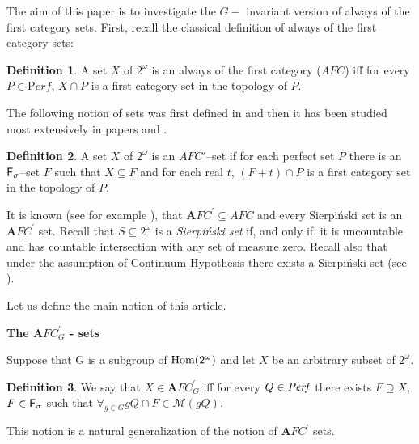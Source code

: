 \documentclass[b5cutpaper, twoside, 11pt, leqno]{moravica}
\newcommand{\afcp}{{\mathbf AFC}^\prime}
\newcommand\afcg{\afcp_{G}}
\newcommand{\seq}{\subseteq}
\newcommand{\ca}{2^{\omega}}
\newcommand{\afc}{AFC}
\newcommand{\mgr}{{\mathcal M}}
\newcommand{\perf}{{\it Perf}}
\newcommand{\fsigma}{{\sf F}_{\sigma}}
\newcommand{\cantor}{\ca}
\newcommand{\Perf}{{\mathrm Perf}}
\newcommand\Hom{{\rm Hom(\ca)}}
\theoremstyle{definition}
\newtheorem{definition}{Definition}[section]
\begin{document}
The aim of this paper is to investigate the $G-$ invariant
version of always of the first category sets.
First, recall the classical definition of always of the first category sets:
\begin{definition}
A set $X$ of $\cantor$ is an always of the first category ($\afc$) 
iff for every $P\in \Perf$, $X\cap P$ is a first category set
in the topology of $P$.
\end{definition}

The following notion of sets was first defined in \cite{NSW}
and then it has been studied most extensively in
papers \cite{NW1} and \cite{NW2}.

\begin{definition}
  A set $X$ of $\cantor$ is an $\afc'$--set if for each perfect
set $P$ there is an $\fsigma$--set $F$ such that $X\subseteq F$
and for each real $t$, $(F + t)\cap P$ is a first
category set in the topology of $P$.
\end{definition}


It is known (see for example \cite{NSW}),
that $\afcp \seq \afc$ and every Sierpi\'nski set is an $\afcp$ set.
Recall that $S \subseteq \cantor$ is a {\it Sierpi\'nski set}
if, and only if, it is uncountable and has countable intersection with
any set of measure zero. Recall also that under the assumption
of Continuum Hypothesis there exists a Sierpi\'nski set (see \cite{Si}).

Let us define the main notion of this article.

\bigskip

{\bf The $\afcg$ - sets}


Suppose that G is a subgroup of $\Hom$
and let $X$ be an arbitrary subset of $\ca$.

\begin{definition}
\label{afcg}
We say that $X \in \afcg$ iff
for every $Q \in \perf$ there
exists $F \supseteq X$, $F\in \fsigma$
such that
$\forall_{g\in G} gQ \cap F \in \mgr(gQ)$.
\end{definition}

  This notion is a natural generalization
of the notion of $\afcp$ sets.

 \\
\end{document}
